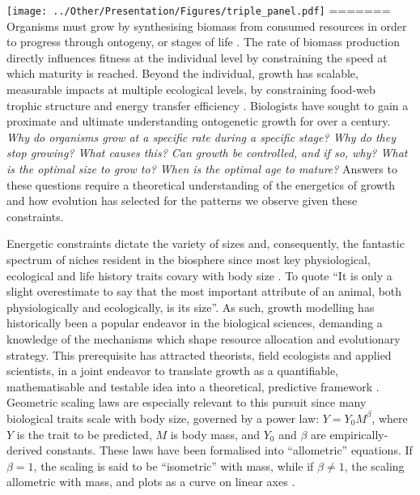 \documentclass[a4paper]{article} %
\begin{document}
    \begin{center}
        \begin{minipage}{\linewidth}
        \texttt{[image: ../Other/Presentation/Figures/triple\_panel.pdf]}
=======
\linenumbers
    Organisms must grow by synthesising biomass from consumed resources in order to progress through ontogeny, or stages of life \autocite{Hariharan2016}. The rate of biomass production directly influences fitness at the individual level by constraining the speed at which maturity is reached. Beyond the individual, growth has scalable, measurable impacts at multiple ecological levels, by constraining food-web trophic structure and energy transfer efficiency \autocite{Barneche2018}. Biologists have sought to gain a proximate and ultimate understanding ontogenetic growth for over a century. \textit{Why do organisms grow at a specific rate during a specific stage? Why do they stop growing? What causes this? Can growth be controlled, and if so, why? What is the optimal size to grow to? When is the optimal age to mature?} Answers to these questions require a theoretical understanding of the energetics of growth and how evolution has selected for the patterns we observe given these constraints. 
    
    Energetic constraints dictate the variety of sizes and, consequently, the fantastic spectrum of niches resident in the biosphere since most key physiological, ecological and life history traits covary with body size \autocite{peters1983, brown2000-scaling-book,schmidt1984scaling,Marshall2019b}. To quote \textcite{Bartholomew1981} ``It is only a slight overestimate to say that the most important attribute of an animal, both physiologically and ecologically, is its size''. As such, growth modelling has historically been a popular endeavor in the biological sciences, demanding a knowledge of the mechanisms which shape resource allocation and evolutionary strategy. This prerequisite has attracted theorists, field ecologists and applied scientists, in a joint endeavor to translate growth as a quantifiable, mathematisable and testable idea into a theoretical, predictive framework \autocite{popper1962,popper1972,peters1983, West2011}. Geometric scaling laws are especially relevant to this pursuit since many biological traits scale with body size, governed by a power law: $Y = Y_0 M^{\beta}$, where $Y$ is the trait to be predicted, $M$ is body mass, and $Y_0$ and $\beta$ are empirically-derived constants. These laws have been formalised into ``allometric'' equations. If $\beta = 1$, the scaling is said to be ``isometric'' with mass, while if $\beta \neq 1$, the scaling allometric with mass, and plots as a curve on linear axes \autocite{brown2000-scaling-book}.


\end{minipage}
\end{center}
\end{document}
